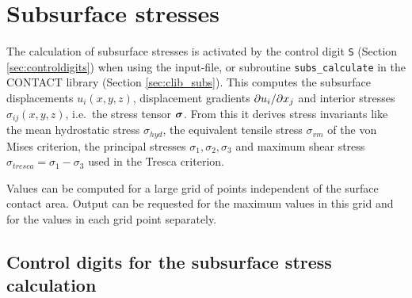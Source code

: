 \documentclass[12pt]{report}
\begin{document}
\section{Subsurface stresses}
\label{sec:subsurf}

The calculation of subsurface stresses is activated by the control digit
{\tt S} (Section \ref{sec:controldigits}) when using the input-file, or
subroutine {\tt subs\_calculate} in the CONTACT library (Section
\ref{sec:clib_subs}). This computes the subsurface
displacements $u_i(x,y,z)$, displacement gradients $\partial u_i/\partial x_j$ and
interior stresses $\sigma_{ij}(x,y,z)$, i.e.\ the stress tensor
$\boldsymbol{\sigma}$. From this it derives stress invariants like the mean
hydrostatic stress $\sigma_{hyd}$, the equivalent tensile stress
$\sigma_{vm}$ of the von Mises criterion, the principal stresses
$\sigma_1, \sigma_2, \sigma_3$ and maximum shear stress
$\sigma_{tresca}=\sigma_1-\sigma_3$ used in the Tresca criterion.

Values can be computed for a large grid of points independent of the
surface contact area. Output can be requested for the maximum values in
this grid and for the values in each grid point separately.

\subsection{Control digits for the subsurface stress calculation}
\label{sec:subsurf_control}
\end{document}

